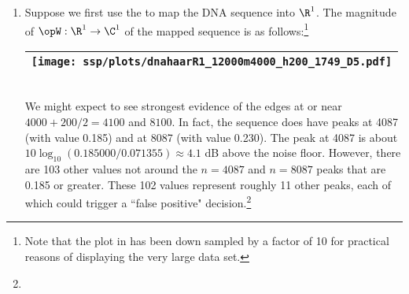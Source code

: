 \begin{example}
\begin{enumerate}
  \item \label{item:dna_haar_R1pam}
    Suppose we first use the   to map
    the DNA sequence into $\R^1$.
    The magnitude of $\opW:\R^1\to\C^1$ of the mapped sequence is as follows:\footnote{
    Note that the plot in  
    has been down sampled by a factor of 10 for practical reasons of displaying the very large data set.}
     \\\begin{tabular}{|>{\scs}c|}
          \hline
          \texttt{[image: ssp/plots/dnahaarR1\_12000m4000\_h200\_1749\_D5.pdf]}%
        \\\hline
     \end{tabular}\\
     We might expect to see strongest evidence of the edges at or near $4000+200/2=4100$ and $8100$.
     In fact, the sequence does have peaks at 4087 (with value 0.185) and at 8087 (with value 0.230).
     The peak at 4087 is about $10\log_{10}(0.185000/0.071355)\approx 4.1$ dB above the noise floor.
     However, there are 103 other values not around the $n=4087$ and $n=8087$ peaks that are 
  0.185 or greater.
  These 102 values represent roughly 11 other peaks, each of which could trigger a 
  ``false positive" decision.\footnote{}
     

\end{enumerate}
\end{example}

